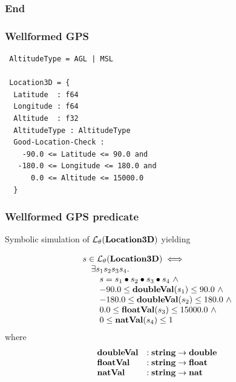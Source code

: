 \documentclass{beamer}
\newcommand{\konst}[1]{\ensuremath{\mbox{\bf{#1}}}}
\newcommand{\LangTheta}[1]{\ensuremath{{\mathcal L}_{\theta}({#1})}}
\begin{document}
\begin{frame}[fragile]\frametitle{End}
\end{frame}



\begin{frame}[fragile]\frametitle{Wellformed GPS}

{\small
\begin{verbatim}
 AltitudeType = AGL | MSL

 Location3D = {
  Latitude  : f64
  Longitude : f64
  Altitude  : f32
  AltitudeType : AltitudeType
  Good-Location-Check :
    -90.0 <= Latitude <= 90.0 and
   -180.0 <= Longitude <= 180.0 and
      0.0 <= Altitude <= 15000.0
  }
\end{verbatim}
}

\end{frame}

\begin{frame}[fragile]\frametitle{Wellformed GPS predicate}

Symbolic simulation of $\LangTheta{\konst{Location3D}}$ yielding

\[
\begin{array}{l}
 s \in \LangTheta{\konst{Location3D}} \iff \\
\quad   \exists s_1 s_2 s_3 s_4. \\
\qquad      s = s_1 \bullet s_2 \bullet s_3 \bullet s_4 \ \land \\
\qquad    -90.0 \leq \konst{doubleVal}(s_1) \leq 90.0 \ \land \\
\qquad   -180.0 \leq \konst{doubleVal}(s_2) \leq 180.0 \ \land \\
\qquad      0.0 \leq \konst{floatVal}(s_3)  \leq 15000.0 \ \land \\
\qquad        0 \leq \konst{natVal}(s_4) \leq 1
\end{array}
\]
%
\noindent where
%
\[
\begin{array}{ll}
 \konst{doubleVal} & : \konst{string} \to \konst{double} \\
 \konst{floatVal}  & : \konst{string} \to \konst{float}  \\
 \konst{natVal}    & : \konst{string} \to \konst{nat}  \\
\end{array}
\]

\end{frame}
\end{document}
